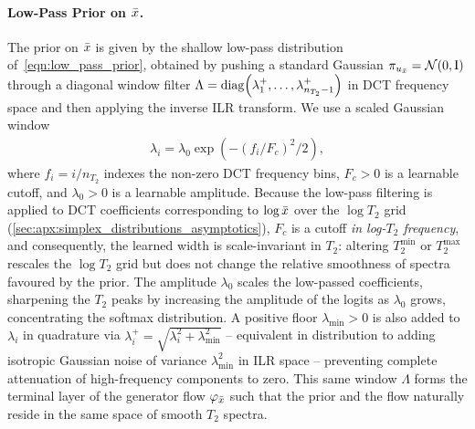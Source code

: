 \paragraph*{Low-Pass Prior on $\bar{x}$.}
The prior on $\bar{x}$ is given by the shallow low-pass distribution of~\cref{eqn:low_pass_prior}, obtained by pushing a standard Gaussian $\pi_{u_{\bar{x}}} = \mathcal{N}(\mathrm{0}, \mathrm{I})$ through a diagonal window filter $\Lambda = \Diag{\lambda_1^+, \ldots, \lambda_{n_{T_2}-1}^+}$ in \gls*{DCT} frequency space and then applying the inverse \gls*{ILR} transform.
We use a scaled Gaussian window
\begin{align}\label{eqn:gaussian_window}
    \lambda_i = \lambda_0 \exp\!\left( -(f_i / F_c)^2 / 2 \right),
\end{align}
where $f_i = i/n_{T_2}$ indexes the non-zero \gls*{DCT} frequency bins, $F_c > 0$ is a learnable cutoff, and $\lambda_0 > 0$ is a learnable amplitude.
Because the low-pass filtering is applied to \gls*{DCT} coefficients corresponding to $\log \bar{x}$ over the $\log T_2$ grid (\cref{sec:apx:simplex_distributions_asymptotics}), $F_c$ is a cutoff \textit{in log-$T_2$ frequency}, and consequently, the learned width is scale-invariant in $T_2$:
altering $T_2^{\min}$ or $T_2^{\max}$ rescales the $\log T_2$ grid but does not change the relative smoothness of spectra favoured by the prior.
The amplitude $\lambda_0$ scales the low-passed coefficients, sharpening the $T_2$ peaks by increasing the amplitude of the logits as $\lambda_0$ grows, concentrating the softmax distribution.
A positive floor $\lambda_{\min} > 0$ is also added to $\lambda_i$ in quadrature via $\lambda_i^{+} = \sqrt{\lambda_i^2 + \lambda_{\min}^2}$ -- equivalent in distribution to adding isotropic Gaussian noise of variance $\lambda_{\min}^2$ in \gls*{ILR} space -- preventing complete attenuation of high-frequency components to zero.
This same window $\Lambda$ forms the terminal layer of the generator flow $\varphi_{\bar{x}}$ such that the prior and the flow naturally reside in the same space of smooth $T_2$ spectra.


